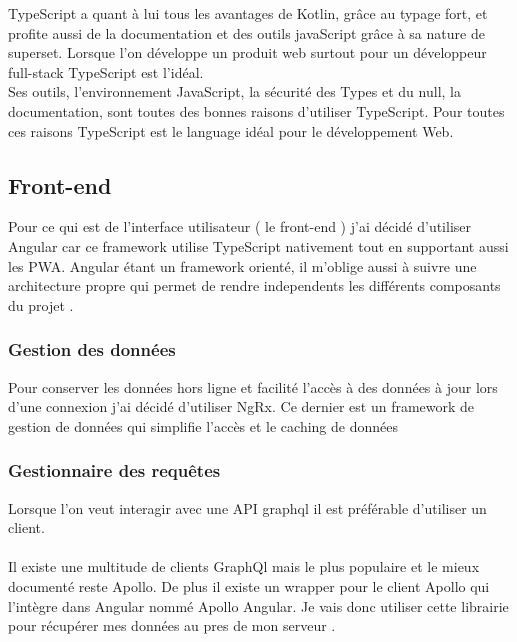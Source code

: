 TypeScript a quant à lui tous les avantages de Kotlin, grâce au typage fort, et profite aussi de la documentation et des outils javaScript grâce à sa nature de superset.
Lorsque l'on développe un produit web surtout pour un développeur full-stack TypeScript est l'idéal.\\
Ses outils, l'environnement JavaScript, la sécurité des Types et du null, la documentation, sont toutes des bonnes raisons d'utiliser TypeScript.
Pour toutes ces raisons TypeScript est le language idéal pour le développement Web.

\subsection{Front-end}\label{subsec:front-end}
Pour ce qui est de l'interface utilisateur ( le front-end ) j'ai décidé d'utiliser Angular car ce framework utilise TypeScript nativement tout en supportant aussi les PWA\@.
Angular étant un framework orienté, il m'oblige aussi à suivre une architecture propre qui permet de rendre independents les différents composants du projet .

\subsubsection{Gestion des données}
Pour conserver les données hors ligne et facilité l'accès à des données à jour lors d'une connexion j'ai décidé d'utiliser NgRx.
Ce dernier est un framework de gestion de données qui simplifie l'accès et le caching de données

\subsubsection{Gestionnaire des requêtes}
Lorsque l'on veut interagir avec une API graphql il est préférable d'utiliser un client.\\\\

Il existe une multitude de clients GraphQl mais le plus populaire et le mieux documenté reste Apollo.
De plus il existe un wrapper pour le client Apollo qui l'intègre dans Angular nommé Apollo Angular.
Je vais donc utiliser cette librairie pour récupérer mes données au pres de mon serveur .

